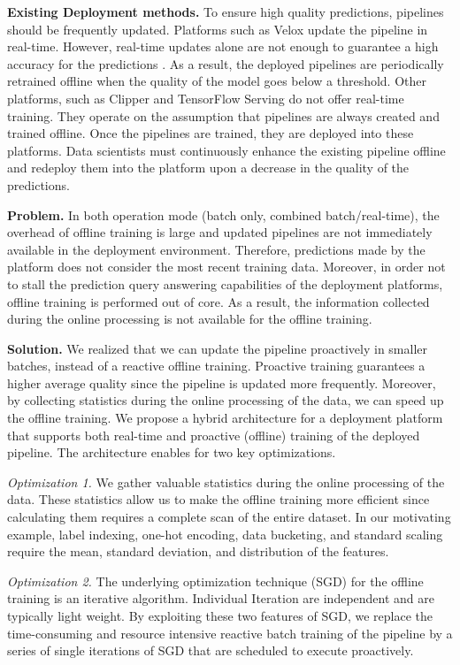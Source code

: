 \documentclass[10pt,conference,letterpaper]{IEEEtran}
\begin{document}
\textbf{Existing Deployment methods.} 
To ensure high quality predictions, pipelines should be frequently updated.
Platforms such as Velox update the pipeline in real-time.
However, real-time updates alone are not enough to guarantee a high accuracy for the predictions \cite{crankshaw2014missing}.
As a result, the deployed pipelines are periodically retrained offline when the quality of the model goes below a threshold.
Other platforms, such as Clipper and TensorFlow Serving do not offer real-time training.
They operate on the assumption that pipelines are always created and trained offline.
Once the pipelines are trained, they are deployed into these platforms.
Data scientists must continuously enhance the existing pipeline offline and redeploy them into the platform upon a decrease in the quality of the predictions.

\textbf{Problem.}
In both operation mode (batch only, combined batch/real-time), the overhead of offline training is large and updated pipelines are not immediately available in the deployment environment.
Therefore, predictions made by the platform does not consider the most recent training data.
Moreover, in order not to stall the prediction query answering capabilities of the deployment platforms, offline training is performed out of core.
As a result, the information collected during the online processing is not available for the offline training. 

\textbf{Solution.} 
We realized that we can update the pipeline proactively in smaller batches, instead of a reactive offline training.
Proactive training guarantees a higher average quality since the pipeline is updated more frequently.
Moreover, by collecting statistics during the online processing of the data, we can speed up the offline training.
We propose a hybrid architecture for a deployment platform that supports both real-time and proactive (offline) training of the deployed pipeline.
The architecture enables for two key optimizations.

\textit{Optimization 1.} 
We gather valuable statistics during the online processing of the data. 
These statistics allow us to make the offline training more efficient since calculating them requires a complete scan of the entire dataset.
In our motivating example, label indexing, one-hot encoding, data bucketing, and standard scaling require the mean, standard deviation, and distribution of the features.

\textit{Optimization 2.}
The underlying optimization technique (SGD) for the offline training is an iterative algorithm.
Individual Iteration are independent and are typically light weight.
By exploiting these two features of SGD, we replace the time-consuming and resource intensive reactive batch training of the pipeline by a series of single iterations of SGD that are scheduled to execute proactively.
\end{document}
